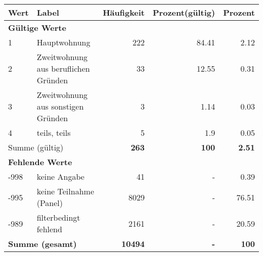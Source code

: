      \begin{longtable}{lXrrr}
     \toprule
     \textbf{Wert} & \textbf{Label} & \textbf{Häufigkeit} & \textbf{Prozent(gültig)} & \textbf{Prozent} \\
     \endhead
     \midrule
     \multicolumn{5}{l}{\textbf{Gültige Werte}}\\

     1 &
     \multicolumn{1}{X}{ Hauptwohnung   } &


       \num{222} &
       \num[round-mode=places,round-precision=2]{84.41} &
         \num[round-mode=places,round-precision=2]{2.12} \\

     2 &
     \multicolumn{1}{X}{ Zweitwohnung aus beruflichen Gründen   } &


       \num{33} &
       \num[round-mode=places,round-precision=2]{12.55} &
         \num[round-mode=places,round-precision=2]{0.31} \\

     3 &
     \multicolumn{1}{X}{ Zweitwohnung aus sonstigen Gründen   } &


       \num{3} &
       \num[round-mode=places,round-precision=2]{1.14} &
         \num[round-mode=places,round-precision=2]{0.03} \\

     4 &
     \multicolumn{1}{X}{ teils, teils   } &


       \num{5} &
       \num[round-mode=places,round-precision=2]{1.9} &
         \num[round-mode=places,round-precision=2]{0.05} \\
     \midrule
     \multicolumn{2}{l}{Summe (gültig)} &
       \textbf{\num{263}} &
     \textbf{\num{100}} &
       \textbf{\num[round-mode=places,round-precision=2]{2.51}} \\
     \multicolumn{5}{l}{\textbf{Fehlende Werte}}\\
       -998 &
       keine Angabe &
         \num{41} &
        - &
         \num[round-mode=places,round-precision=2]{0.39} \\
       -995 &
       keine Teilnahme (Panel) &
         \num{8029} &
        - &
         \num[round-mode=places,round-precision=2]{76.51} \\
       -989 &
       filterbedingt fehlend &
         \num{2161} &
        - &
         \num[round-mode=places,round-precision=2]{20.59} \\
     \midrule
     \multicolumn{2}{l}{\textbf{Summe (gesamt)}} &
          \textbf{\num{10494}} &
        \textbf{-} &
        \textbf{\num{100}} \\
     \bottomrule
     \end{longtable}
     
